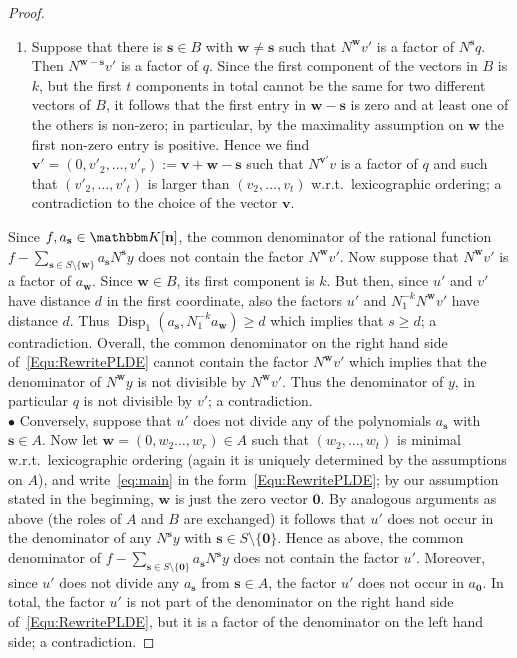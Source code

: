 \documentclass[a4paper]{sig-alternate}
\let\set\mathbbm
\def\vec#1{\mathbf{#1}}
\def\disp{\operatorname{Disp}}
\begin{document}
\begin{proof}
\begin{enumerate}
\item Suppose that there is $\vec{s}\in B$ with $\vec w\neq\vec{s}$ such that $N^{\vec w}v'$ is a factor of $N^{\vec s}q$. Then $N^{\vec w-\vec s}v'$ is a factor of $q$. Since the first component of the vectors in $B$ is $k$, but the first $t$ components in total cannot be the same for two different vectors of $B$, it follows that the first entry in $\vec w-\vec s$ is zero and at least one of the others is non-zero; in particular, by the maximality assumption on $\vec{w}$ the first non-zero entry is positive. Hence we find $\vec v'=(0,v'_2,\dots,v'_r):=\vec v+\vec w-\vec s$ such that $N^{\vec v'}v$ is a factor of $q$ and such that $(v'_2,\dots,v'_t)$ is larger than $(v_2,\dots,v_t)$ w.r.t.\ lexicographic ordering; a contradiction to the choice of the vector $\vec v$.
\end{enumerate}
Since $f,a_{\vec{s}}\in\set K[\vec{n}]$, the common denominator of the rational function
$f-\sum_{\vec{s}\in S\setminus\{\vec{w}\}}a_{\vec{s}}N^{\vec{s}}y$ does not contain the factor  $N^{\vec w}v'$.  Now suppose that $N^{\vec w}v'$ is a factor of $a_{\vec{w}}$. Since $\vec{w}\in B$,
its first component is $k$. But then, since $u'$ and $v'$ have distance $d$ in the first coordinate, also the factors $u'$ and $N_1^{-k}N^{\vec{w}}v'$ have distance $d$. Thus
$\disp_1(a_{\vec{s}},N_1^{-k} a_{\vec w})\geq d$ which implies that $s\geq d$; a contradiction. Overall, the common denominator on the right hand side of~\eqref{Equ:RewritePLDE} cannot contain the factor $N^{\vec w}v'$ which implies that the denominator of $N^{\vec w}y$ is not divisible by $N^{\vec w}v'$. Thus the denominator of $y$, in particular $q$ is not divisible by $v'$; a contradiction.\\
$\bullet$ Conversely, suppose that $u'$ does not divide any of the polynomials $a_\vec{s}$ with $\vec{s}\in A$. Now let $\vec w=(0,w_2\dots,w_r)\in A$ such that $(w_2,\dots,w_t)$ is minimal w.r.t.\ lexicographic ordering (again it is uniquely determined by the assumptions on $A$), and write~\eqref{eq:main} in the form~\eqref{Equ:RewritePLDE}; by our assumption stated in the beginning, $\vec w$ is just the zero vector $\vec{0}$. By analogous arguments as above (the roles of $A$ and $B$ are exchanged) it follows that $u'$ does not occur in the denominator of any $N^{\vec s}y$ with $\vec s\in S\setminus\{\vec{0}\}$. Hence as above, the common denominator of
$f-\sum_{\vec{s}\in S\setminus\{\vec{0}\}}a_{\vec{s}}N^{\vec{s}}y$ does not contain the factor  $u'$. Moreover, since $u'$ does not divide any $a_{\vec{s}}$ from $\vec{s}\in A$, the factor $u'$ does not occur in $a_{\vec{0}}$. In total, the factor $u'$ is not part of the denominator on the right hand side of~\eqref{Equ:RewritePLDE}, but it is a factor of the denominator on the left hand side; a
contradiction.
\end{proof}
\end{document}
